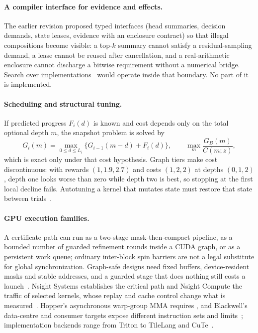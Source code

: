 \paragraph{A compiler interface for evidence and effects.} The earlier revision proposed typed interfaces (head summaries, decision demands, state leases, evidence with an enclosure contract) so that illegal compositions become visible: a top-$k$ summary cannot satisfy a residual-sampling demand, a lease cannot be reused after cancellation, and a real-arithmetic enclosure cannot discharge a bitwise requirement without a numerical bridge. Search over implementations~\cite{mirage} would operate inside that boundary. No part of it is implemented.

\paragraph{Scheduling and structural tuning.} If predicted progress $F_i(d)$ is known and cost depends only on the total optional depth $m$, the snapshot problem is solved by
\begin{equation}
G_i(m)=\max_{0\le d\le L_i}\{G_{i-1}(m-d)+F_i(d)\},\qquad\max_m\frac{G_B(m)}{C(m;z)},\label{eq:schedDP}
\end{equation}
which is exact only under that cost hypothesis. Graph tiers make cost discontinuous: with rewards $(1,1.9,2.7)$ and costs $(1,2,2)$ at depths $(0,1,2)$, depth one looks worse than zero while depth two is best, so stopping at the first local decline fails. Autotuning a kernel that mutates state must restore that state between trials~\cite{tritonautotune}.

\paragraph{GPU execution families.} A certificate path can run as a two-stage mask-then-compact pipeline, as a bounded number of guarded refinement rounds inside a CUDA graph, or as a persistent work queue; ordinary inter-block spin barriers are not a legal substitute for global synchronization. Graph-safe designs need fixed buffers, device-resident masks and stable addresses, and a guarded stage that does nothing still costs a launch~\cite{vllmgraphs}. Nsight Systems establishes the critical path and Nsight Compute the traffic of selected kernels, whose replay and cache control change what is measured~\cite{nsight}. Hopper's asynchronous warp-group MMA requires , and Blackwell's data-centre and consumer targets expose different instruction sets and limits~\cite{ptxisa,hopper,blackwell}; implementation backends range from Triton to TileLang and CuTe~\cite{cute,tilelang,tritonautotune}.

